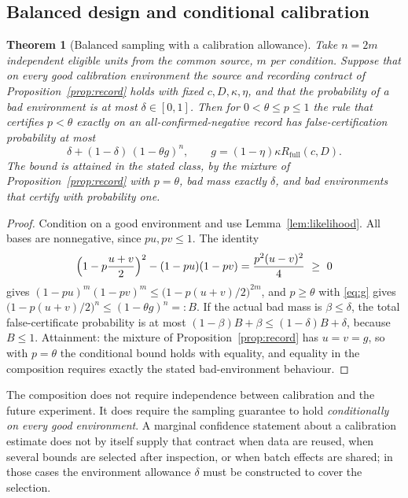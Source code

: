 \documentclass[11pt]{article}
\newtheorem{theorem}{Theorem}[section]
\theoremstyle{definition}
\theoremstyle{remark}
\newcommand{\Rfull}{R_{\mathrm{full}}}
\begin{document}
\subsection{Balanced design and conditional calibration}

\begin{theorem}[Balanced sampling with a calibration allowance]\label{thm:root}
Take $n=2m$ independent eligible units from the common source, $m$ per
condition. Suppose that on every \emph{good} calibration environment the source
and recording contract of Proposition~\ref{prop:record} holds with fixed
$c,D,\kappa,\eta$, and that the probability of a bad environment is at most
$\delta\in[0,1]$. Then for $0<\theta\le p\le1$ the rule that certifies
$p<\theta$ exactly on an all-confirmed-negative record has false-certification
probability at most
\begin{equation}\label{eq:root}
\delta+(1-\delta)\,(1-\theta g)^n,\qquad g=(1-\eta)\kappa\Rfull(c,D).
\end{equation}
The bound is attained in the stated class, by the mixture of
Proposition~\ref{prop:record} with $p=\theta$, bad mass exactly $\delta$, and bad
environments that certify with probability one.
\end{theorem}

\begin{proof}
Condition on a good environment and use Lemma~\ref{lem:likelihood}. All bases are
nonnegative, since $pu,pv\le1$. The identity
\begin{equation}\label{eq:amgm}
\Bigl(1-p\frac{u+v}{2}\Bigr)^2-(1-pu)(1-pv)=\frac{p^2(u-v)^2}{4}\ \ge\ 0
\end{equation}
gives $(1-pu)^m(1-pv)^m\le\bigl(1-p(u+v)/2\bigr)^{2m}$, and
$p\ge\theta$ with \eqref{eq:g} gives
$\bigl(1-p(u+v)/2\bigr)^{n}\le(1-\theta g)^n=:B$. If the actual bad mass is
$\beta\le\delta$, the total false-certificate probability is at most
$(1-\beta)B+\beta\le(1-\delta)B+\delta$, because $B\le1$. Attainment: the
mixture of Proposition~\ref{prop:record} has $u=v=g$, so with $p=\theta$ the
conditional bound holds with equality, and equality in the composition requires
exactly the stated bad-environment behaviour.
\end{proof}

The composition does not require independence between calibration and the future
experiment. It does require the sampling guarantee to hold \emph{conditionally on
every good environment}. A marginal confidence statement about a calibration
estimate does not by itself supply that contract when data are reused, when
several bounds are selected after inspection, or when batch effects are shared;
in those cases the environment allowance $\delta$ must be constructed to cover
the selection.
\end{document}
